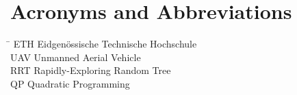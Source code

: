 \section*{Acronyms and Abbreviations}
\begin{tabbing}
 \hspace*{1.6cm}  \= \kill
 ETH \> Eidgen\"{o}ssische Technische Hochschule \\[0.5ex]
 UAV \> Unmanned Aerial Vehicle \\[0.5ex]
RRT \> Rapidly-Exploring Random Tree\\[0.5ex]
QP \>  Quadratic Programming\\[0.5ex]
\end{tabbing}

 \cleardoublepage

